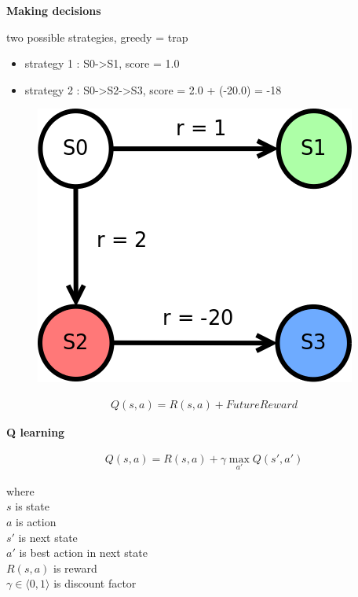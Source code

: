 \documentclass[xcolor=dvipsnames]{beamer}
\begin{document}
\begin{frame}{\bf Making decisions}

two possible strategies, {\color{red} greedy = trap}
\begin{itemize}
  \item strategy 1 : S0->S1, score = 1.0
  \item strategy 2 : S0->S2->S3, score = 2.0 + (-20.0) = -18
\end{itemize}

  \begin{figure}
    \includegraphics[scale=0.4]{../../diagrams/rl_trivial_trap.png}
  \end{figure}

  \begin{align*}
    Q(s, a) = R(s, a) + FutureReward
  \end{align*}

\end{frame}


\begin{frame}{\bf Q learning}

\begin{align*}
Q(s, a) = R(s, a) + \gamma \max \limits_{a'} Q(s', a')
\end{align*}

where \\
$s$ is state \\
$a$ is action \\
$s'$ is next state \\
$a'$ is best action in next state \\
$R(s, a)$ is reward \\
$\gamma \in \langle 0, 1 \rangle$ is discount factor \\

\end{frame}
\end{document}

